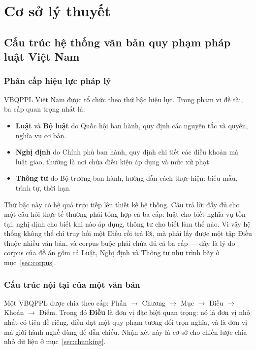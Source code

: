 \documentclass[12pt,a4paper]{report}
\numberwithin{equation}{chapter}
\numberwithin{figure}{chapter}
\numberwithin{table}{chapter}
\begin{document}
\chapter{Cơ sở lý thuyết}

\section{Cấu trúc hệ thống văn bản quy phạm pháp luật Việt Nam}

\subsection{Phân cấp hiệu lực pháp lý}
VBQPPL Việt Nam được tổ chức theo thứ bậc hiệu lực. Trong phạm vi đề tài, ba cấp
quan trọng nhất là:

\begin{itemize}
    \item \textbf{Luật} và \textbf{Bộ luật} do Quốc hội ban hành, quy định các
    nguyên tắc và quyền, nghĩa vụ cơ bản.
    \item \textbf{Nghị định} do Chính phủ ban hành, quy định chi tiết các điều
    khoản mà luật giao, thường là nơi chứa điều kiện áp dụng và mức xử phạt.
    \item \textbf{Thông tư} do Bộ trưởng ban hành, hướng dẫn cách thực hiện: biểu
    mẫu, trình tự, thời hạn.
\end{itemize}

Thứ bậc này có hệ quả trực tiếp lên thiết kế hệ thống. Câu trả lời đầy đủ cho một
câu hỏi thực tế thường phải tổng hợp cả ba cấp: luật cho biết nghĩa vụ tồn tại,
nghị định cho biết khi nào áp dụng, thông tư cho biết làm thế nào. Vì vậy hệ thống
không thể chỉ truy hồi một Điều rồi trả lời, mà phải lấy được một tập Điều thuộc
nhiều văn bản, và corpus buộc phải chứa đủ cả ba cấp --- đây là lý do corpus của
đồ án gồm cả Luật, Nghị định và Thông tư như trình bày ở mục~\ref{sec:corpus}.

\subsection{Cấu trúc nội tại của một văn bản}
Một VBQPPL được chia theo cấp: Phần $\rightarrow$ Chương $\rightarrow$ Mục
$\rightarrow$ Điều $\rightarrow$ Khoản $\rightarrow$ Điểm. Trong đó \textbf{Điều}
là đơn vị đặc biệt quan trọng: nó là đơn vị nhỏ nhất có tiêu đề riêng, diễn đạt
một quy phạm tương đối trọn nghĩa, và là đơn vị mà giới hành nghề dùng để dẫn
chiếu. Nhận xét này là cơ sở cho chiến lược chia nhỏ dữ liệu ở
mục~\ref{sec:chunking}.
\end{document}

